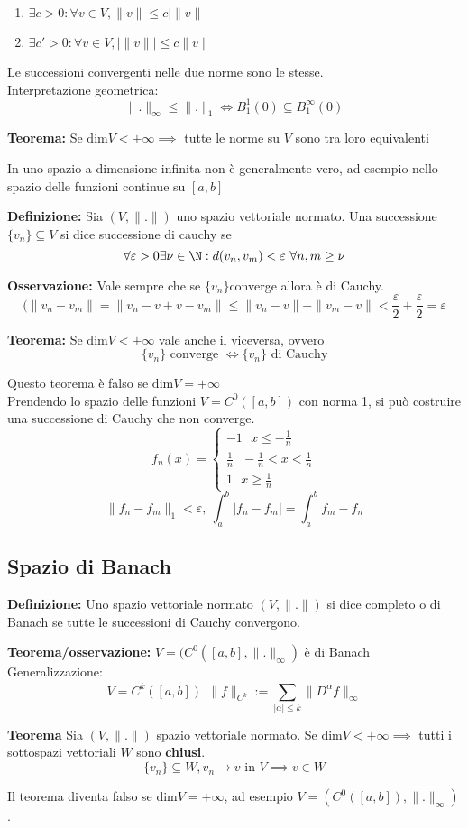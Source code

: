 \begin{enumerate}
	\item $\exists c>0:\forall v\in V,\|v\|\le c|\|v\||$
	\item $\exists c'>0:\forall v\in V,|\|v\||\le c\|v\|$
\end{enumerate}
Le successioni convergenti nelle due norme sono le stesse.
\\Interpretazione geometrica:
\[\|.\|_\infty\le \|.\|_1\iff B_1^1(0)\subseteq  B_1^\infty(0)\]
\begin{tcolorbox}
	\textbf{Teorema:} Se $\text{dim}V<+\infty\implies$ tutte le norme su $V$ sono tra loro equivalenti
\end{tcolorbox}
In uno spazio a dimensione infinita non è generalmente vero, ad esempio nello spazio delle funzioni continue su $[a,b]$
\begin{tcolorbox}
	\textbf{Definizione:} Sia $(V,\|.\|)$ uno spazio vettoriale normato. Una successione $\{v_n\} \subseteq V$ si dice successione di cauchy se 
	\[\forall \varepsilon>0 \exists \nu\in\N:d(v_n,v_m)<\varepsilon\ \forall n,m\ge \nu\]
\end{tcolorbox}
\textbf{Osservazione:} Vale sempre che se $\{v_n\} $converge allora è di Cauchy.
\[(\|v_n-v_m\|=\|v_n-v+v-v_m\|\le \|v_n-v\|+\|v_m-v\|<\frac{\varepsilon}{2}+\frac{\varepsilon}{2}=\varepsilon\]
\begin{tcolorbox}
	\textbf{Teorema:} Se $\text{dim}V<+\infty$ vale anche il viceversa, ovvero
	\[\{v_n\} \text{ converge }\iff \{v_n\} \text{ di Cauchy}\]
\end{tcolorbox}
Questo teorema è falso se $\text{dim}V=+\infty$
\\Prendendo lo spazio delle funzioni $V=C^0([a,b])$ con norma 1, si può costruire una successione di Cauchy che non converge.
\[f_n(x)=\begin{cases}
	-1\ \ \ x\le -\frac{1}{n}
	\\\frac{1}{n}\ \ \ -\frac{1}{n}<x<\frac{1}{n}
	\\1\ \ \ x\ge \frac{1}{n}
\end{cases}
\]
\[\|f_n-f_m\|_1<\varepsilon,\ \int_{a}^{b} |f_n-f_m|=\int_{a}^{b} f_m-f_n\]
\subsection{Spazio di Banach}
\begin{tcolorbox}
	\textbf{Definizione:} Uno spazio vettoriale normato $(V,\|.\|)$ si dice completo o di Banach se tutte le successioni di Cauchy convergono.
\end{tcolorbox}
\textbf{Teorema/osservazione: }$V=(C^0([a,b],\|.\|_\infty)$ è di Banach
\\Generalizzazione:
\[V=C^k([a,b])\ \ \|f\|_{C^k}:=\sum_{|\alpha|\le k}^{} \|D^\alpha f\|_\infty\]
\begin{tcolorbox}
	\textbf{Teorema} Sia $(V,\|.\|)$ spazio vettoriale normato. Se $\text{dim}V<+\infty\implies$ tutti i sottospazi vettoriali $W$ sono \textbf{chiusi}.
	\[\{v_n\} \subseteq  W,v_n\to v\text{ in }V\implies v\in W\]
\end{tcolorbox}
Il teorema diventa falso se $\text{dim}V=+\infty$, ad esempio $V=(C^0([a,b]), \|.\|_\infty)$.

